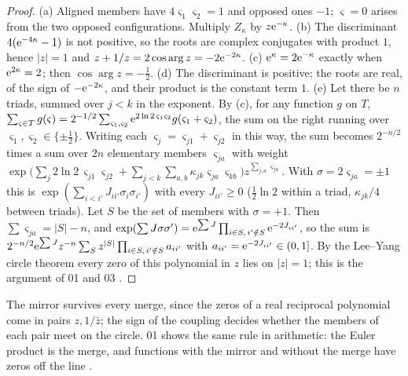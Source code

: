 \documentclass[11pt]{article}
\theoremstyle{definition}\newtheorem{definition}[theorem]{Definition}
\theoremstyle{remark}\newtheorem{remark}[theorem]{Remark}
\begin{document}
\begin{proof}
(a) Aligned members have $4\varsigma_1\varsigma_2=1$ and opposed ones $-1$; $\varsigma=0$ arises from the two opposed configurations. Multiply $Z_\kappa$ by $z\mathrm e^{-\kappa}$. (b) The discriminant $4(\mathrm e^{-4\kappa}-1)$ is not positive, so the roots are complex conjugates with product $1$, hence $|z|=1$ and $z+1/z=2\cos\arg z=-2\mathrm e^{-2\kappa}$. (c) $\mathrm e^\kappa=2\mathrm e^{-\kappa}$ exactly when $\mathrm e^{2\kappa}=2$; then $\cos\arg z=-\frac12$. (d) The discriminant is positive; the roots are real, of the sign of $-\mathrm e^{-2\kappa}$, and their product is the constant term $1$. (e) Let there be $n$ triads, summed over $j<k$ in the exponent. By (c), for any function $g$ on $T$, $\sum_{\varsigma\in T}g(\varsigma)=2^{-1/2}\sum_{\varsigma_1,\varsigma_2}\mathrm e^{2\ln2\,\varsigma_1\varsigma_2}g(\varsigma_1+\varsigma_2)$, the sum on the right running over $\varsigma_1,\varsigma_2\in\{\pm\frac12\}$. Writing each $\varsigma_j=\varsigma_{j1}+\varsigma_{j2}$ in this way, the sum becomes $2^{-n/2}$ times a sum over $2n$ elementary members $\varsigma_{ja}$ with weight $\exp\bigl(\sum_j2\ln2\,\varsigma_{j1}\varsigma_{j2}+\sum_{j<k}\sum_{a,b}\kappa_{jk}\varsigma_{ja}\varsigma_{kb}\bigr)z^{\sum_{j,a}\varsigma_{ja}}$. With $\sigma=2\varsigma_{ja}=\pm1$ this is $\exp(\sum_{i<i'}J_{ii'}\sigma_i\sigma_{i'})$ with every $J_{ii'}\ge0$ ($\frac12\ln2$ within a triad, $\kappa_{jk}/4$ between triads). Let $S$ be the set of members with $\sigma=+1$. Then $\sum\varsigma_{ja}=|S|-n$, and $\exp(\sum J\sigma\sigma')=\mathrm e^{\sum J}\prod_{i\in S,\,i'\notin S}\mathrm e^{-2J_{ii'}}$, so the sum is $2^{-n/2}\mathrm e^{\sum J}z^{-n}\sum_S z^{|S|}\prod_{i\in S,\,i'\notin S}a_{ii'}$ with $a_{ii'}=\mathrm e^{-2J_{ii'}}\in(0,1]$. By the Lee--Yang circle theorem \cite{LeeYang} every zero of this polynomial in $z$ lies on $|z|=1$; this is the argument of 01 and 03 \cite{SMath,SQuant}.
\end{proof}
The mirror survives every merge, since the zeros of a real reciprocal polynomial come in pairs $z,1/\bar z$; the sign of the coupling decides whether the members of each pair meet on the circle. 01 shows the same rule in arithmetic: the Euler product is the merge, and functions with the mirror and without the merge have zeros off the line \cite{SMath}.
\end{document}
